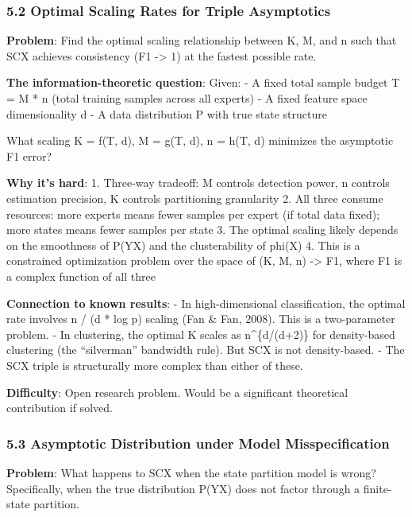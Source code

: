 \documentclass[
  12pt,
]{article}
\begin{document}
\subsubsection{5.2 Optimal Scaling Rates for Triple
Asymptotics}\label{optimal-scaling-rates-for-triple-asymptotics}

\textbf{Problem}: Find the optimal scaling relationship between K, M,
and n such that SCX achieves consistency (F1 -\textgreater{} 1) at the
fastest possible rate.

\textbf{The information-theoretic question}: Given: - A fixed total
sample budget T = M * n (total training samples across all experts) - A
fixed feature space dimensionality d - A data distribution P with true
state structure

What scaling K = f(T, d), M = g(T, d), n = h(T, d) minimizes the
asymptotic F1 error?

\textbf{Why it's hard}: 1. Three-way tradeoff: M controls detection
power, n controls estimation precision, K controls partitioning
granularity 2. All three consume resources: more experts means fewer
samples per expert (if total data fixed); more states means fewer
samples per state 3. The optimal scaling likely depends on the
smoothness of P(Y\textbar X) and the clusterability of phi(X) 4. This is
a constrained optimization problem over the space of (K, M, n)
-\textgreater{} F1, where F1 is a complex function of all three

\textbf{Connection to known results}: - In high-dimensional
classification, the optimal rate involves n / (d * log p) scaling (Fan
\& Fan, 2008). This is a two-parameter problem. - In clustering, the
optimal K scales as n\^{}\{d/(d+2)\} for density-based clustering (the
``silverman'' bandwidth rule). But SCX is not density-based. - The SCX
triple is structurally more complex than either of these.

\textbf{Difficulty}: Open research problem. Would be a significant
theoretical contribution if solved.

\subsubsection{5.3 Asymptotic Distribution under Model
Misspecification}\label{asymptotic-distribution-under-model-misspecification}

\textbf{Problem}: What happens to SCX when the state partition model is
wrong? Specifically, when the true distribution P(Y\textbar X) does not
factor through a finite-state partition.
\end{document}

